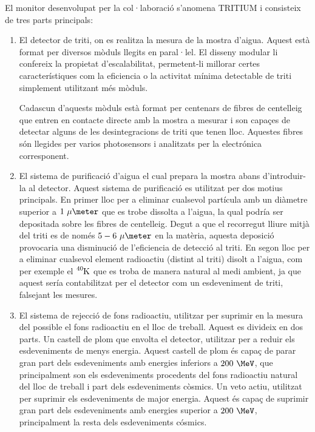 El monitor desenvolupat per la col·laboració s'anomena TRITIUM i consisteix de tres parts principals:

\begin{enumerate}

\item{} El detector de triti, on es realitza la mesura de la mostra d'aigua. Aquest està format per diversos mòduls llegits en paral·lel. El disseny modular li confereix la propietat d'escalabilitat, permetent-li millorar certes característiques com la eficiencia o la activitat mínima detectable de triti simplement utilitzant més mòduls.

Cadascun d'aquests mòduls està format per centenars de fibres de centelleig que entren en contacte directe amb la mostra a mesurar i son capaçes de detectar alguns de les desintegracions de triti que tenen lloc. Aquestes fibres són llegides per varios photosensors i analitzats per la electrónica corresponent.

\item{} El sistema de purificació d'aigua el cual prepara la mostra abans d'introduir-la al detector. Aquest sistema de purificació es utilitzat per dos motius principals. En primer lloc per a eliminar cualsevol partícula amb un diàmetre superior a $1~\mu\meter$ que es trobe dissolta a l'aigua, la qual podría ser depositada sobre les fibres de centelleig. Degut a que el recorregut lliure mitjà del triti es de només $5-6~\mu\meter$ en la matèria, aquesta deposició provocaria una disminució de l'eficiencia de detecció al triti. En segon lloc per a eliminar cualsevol element radioactiu (distint al triti) disolt a l'aigua, com per exemple el $\ce{^{40}K}$ que es troba de manera natural al medi ambient, ja que aquest sería contabilitzat per el detector com un esdeveniment de triti, falsejant les mesures.

\item{} El sistema de rejecció de fons radioactiu, utilitzar per suprimir en la mesura del possible el fons radioactiu en el lloc de treball. Aquest es divideix en dos parts. Un castell de plom que envolta el detector, utilitzar per a reduir els esdeveniments de menys energia. Aquest castell de plom és capaç de parar gran part dels esdeveniments amb energies inferiors a $200~\MeV$, que principalment son els esdeveniments procedents del fons radioactiu natural del lloc de treball i part dels esdeveniments còsmics. Un veto actiu, utilitzat per suprimir els esdeveniments de major energia. Aquest és capaç de suprimir gran part dels esdeveniments amb energies superior a $200~\MeV$, principalment la resta dels esdeveniments cósmics.

\end{enumerate}

